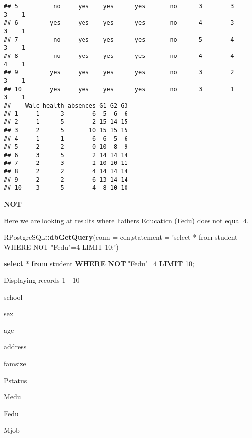 \documentclass[]{book}
\newenvironment{Shaded}{\begin{snugshade}}{\end{snugshade}}
\newcommand{\KeywordTok}[1]{\textcolor[rgb]{0.13,0.29,0.53}{\textbf{#1}}}
\newcommand{\DataTypeTok}[1]{\textcolor[rgb]{0.13,0.29,0.53}{#1}}
\newcommand{\DecValTok}[1]{\textcolor[rgb]{0.00,0.00,0.81}{#1}}
\newcommand{\StringTok}[1]{\textcolor[rgb]{0.31,0.60,0.02}{#1}}
\newcommand{\OtherTok}[1]{\textcolor[rgb]{0.56,0.35,0.01}{#1}}
\newcommand{\OperatorTok}[1]{\textcolor[rgb]{0.81,0.36,0.00}{\textbf{#1}}}
\newcommand{\NormalTok}[1]{#1}
\begin{document}
\begin{verbatim}
## 5          no     yes    yes      yes       no      3        3     3    1
## 6         yes     yes    yes      yes       no      4        3     3    1
## 7          no     yes    yes      yes       no      5        4     3    1
## 8          no     yes    yes      yes       no      4        4     4    1
## 9         yes     yes    yes      yes       no      3        2     3    1
## 10        yes     yes    yes      yes       no      3        1     3    1
##    Walc health absences G1 G2 G3
## 1     1      3        6  5  6  6
## 2     1      5        2 15 14 15
## 3     2      5       10 15 15 15
## 4     1      1        6  6  5  6
## 5     2      2        0 10  8  9
## 6     3      5        2 14 14 14
## 7     2      3        2 10 10 11
## 8     2      2        4 14 14 14
## 9     2      2        6 13 14 14
## 10    3      5        4  8 10 10
\end{verbatim}

\textbf{NOT}

Here we are looking at results where Fathers Education (Fedu) does not
equal 4.

\begin{Shaded}
\begin{Highlighting}[]
\NormalTok{RPostgreSQL}\OperatorTok{::}\KeywordTok{dbGetQuery}\NormalTok{(}\DataTypeTok{conn =}\NormalTok{ con,}\DataTypeTok{statement =} \StringTok{'select * from student WHERE NOT "Fedu"=4 LIMIT 10;'}\NormalTok{)}
\end{Highlighting}
\end{Shaded}

\begin{Shaded}
\begin{Highlighting}[]
\KeywordTok{select}\NormalTok{ * }\KeywordTok{from}\NormalTok{ student }\KeywordTok{WHERE} \KeywordTok{NOT} \OtherTok{"Fedu"}\NormalTok{=}\DecValTok{4} \KeywordTok{LIMIT} \DecValTok{10}\NormalTok{;}
\end{Highlighting}
\end{Shaded}

\label{tab:unnamed-chunk-30}Displaying records 1 - 10

school

sex

age

address

famsize

Pstatus

Medu

Fedu

Mjob
\end{document}
